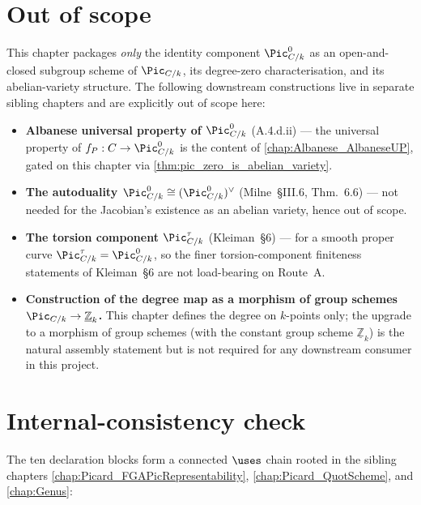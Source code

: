 \section{Out of scope}
\label{sec:pic0_out_of_scope}

This chapter packages \emph{only} the identity component
\(\Pic^0_{C/k}\) as an open-and-closed subgroup scheme of \(\Pic_{C/k}\),
its degree-zero characterisation, and its abelian-variety structure.
The following downstream constructions live in separate sibling
chapters and are explicitly out of scope here:

\begin{itemize}
  \item \textbf{Albanese universal property of \(\Pic^0_{C/k}\)}
    (A.4.d.ii) --- the universal property of \(f_P : C \to \Pic^0_{C/k}\)
    is the content of \cref{chap:Albanese_AlbaneseUP}, gated on this
    chapter via \cref{thm:pic_zero_is_abelian_variety}.
  \item \textbf{The autoduality \(\Pic^0_{C/k} \cong (\Pic^0_{C/k})^\vee\)}
    (Milne~\S III.6, Thm.~6.6) --- not needed for the Jacobian's
    existence as an abelian variety, hence out of scope.
  \item \textbf{The torsion component \(\Pic^\tau_{C/k}\)}
    (Kleiman~\S 6) --- for a smooth proper curve
    \(\Pic^\tau_{C/k} = \Pic^0_{C/k}\), so the finer torsion-component
    finiteness statements of Kleiman~\S 6 are not load-bearing on
    Route~A.
  \item \textbf{Construction of the degree map as a morphism of group
    schemes \(\Pic_{C/k} \to \underline{\mathbb{Z}}_k\).} This chapter
    defines the degree on \(k\)-points only; the upgrade to a
    morphism of group schemes (with the constant group scheme
    \(\underline{\mathbb{Z}}_k\)) is the natural assembly statement but
    is not required for any downstream consumer in this project.
\end{itemize}

\section{Internal-consistency check}
\label{sec:pic0_consistency_check}

The ten declaration blocks form a connected \(\uses\) chain rooted in
the sibling chapters \cref{chap:Picard_FGAPicRepresentability},
\cref{chap:Picard_QuotScheme}, and \cref{chap:Genus}:

